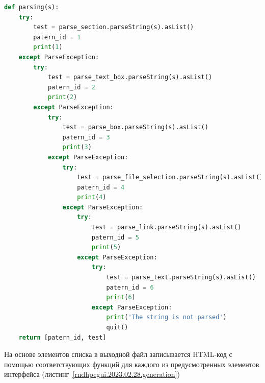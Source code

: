 \begin{lstlisting}[frame=single, label={rndhpcgui.2023.02.28.parsing}, caption={Функция parsing}, language={Python}]
	def parsing(s):
    try:
        test = parse_section.parseString(s).asList()
        patern_id = 1
        print(1)
    except ParseException:
        try:
            test = parse_text_box.parseString(s).asList()
            patern_id = 2
            print(2)
        except ParseException:
            try:
                test = parse_box.parseString(s).asList()
                patern_id = 3
                print(3)
            except ParseException:
                try:
                    test = parse_file_selection.parseString(s).asList()
                    patern_id = 4
                    print(4)
                except ParseException:
                    try:
                        test = parse_link.parseString(s).asList()
                        patern_id = 5
                        print(5)
                    except ParseException:
                        try:
                            test = parse_text.parseString(s).asList()
                            patern_id = 6
                            print(6)
                        except ParseException:
                            print('The string is not parsed')
                            quit()
    return [patern_id, test]
\end{lstlisting}

На основе элементов списка в выходной файл записывается HTML-код с помощью соответствующих функций для каждого из предусмотренных элементов интерфейса (листинг~\ref{rndhpcgui.2023.02.28.generation})

